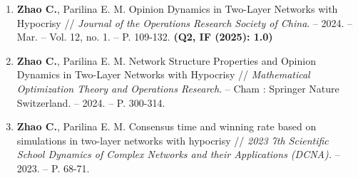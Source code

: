 \documentclass[letterpaper,10pt,fontset=none]{ctexart}
\begin{document}
\begin{enumerate}[itemsep=2pt,parsep=0pt]
  \item \textbf{Zhao C.}, Parilina E. M. Opinion Dynamics in Two-Layer Networks with Hypocrisy // {\it Journal of the Operations Research Society of China}. -- 2024. -- Mar. -- Vol. 12, no. 1. -- P. 109-132. {\bf (Q2, IF (2025): 1.0)}
  \item \textbf{Zhao C.}, Parilina E. M. Network Structure Properties and Opinion Dynamics in Two-Layer Networks with Hypocrisy // {\it Mathematical Optimization Theory and Operations Research}. -- Cham : Springer Nature Switzerland. -- 2024. -- P. 300-314.
  \item \textbf{Zhao C.}, Parilina E. M. Consensus time and winning rate based on simulations in two-layer networks with hypocrisy // {\it 2023 7th Scientific School Dynamics of Complex Networks and their Applications (DCNA).} -- 2023. -- P. 68-71.
\end{enumerate}
\end{document}
